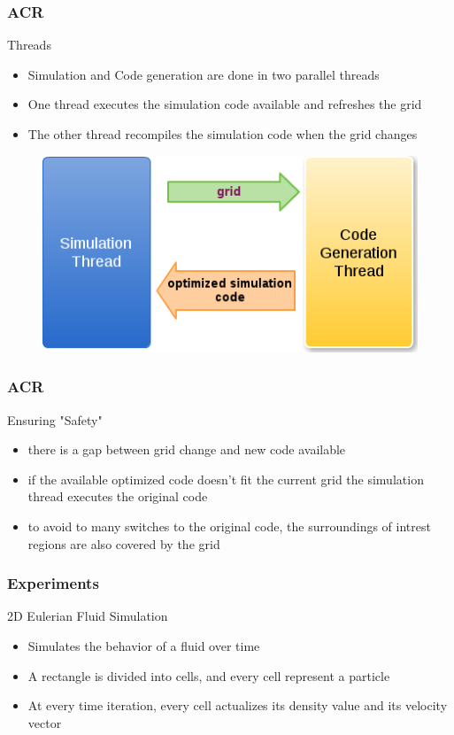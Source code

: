 \documentclass{beamer}\usetheme{Madrid} %
\begin{document}
\begin{frame}
\frametitle { ACR } Threads
\begin{itemize}
	\item
		Simulation and Code generation are done in two parallel threads
	\item
		One thread executes the simulation code available and refreshes 
		the grid
	\item
		The other thread recompiles the simulation code when the grid 
		changes
\end{itemize}
	\begin{figure}
        \includegraphics[scale=0.50]{img/threads-w.png}
\end{figure}
\end{frame}
\begin{frame}
\frametitle { ACR } Ensuring "Safety" 
\begin{itemize}
	\item
		there is a gap between grid change and new code available
	\item
		if the available optimized code doesn't fit the current grid
		the simulation thread executes the original code
	\item
		to avoid to many switches to the original code, the surroundings
		of intrest regions are also covered by the grid
\end{itemize}
\end{frame}
\begin{frame}
\frametitle { Experiments } 2D Eulerian Fluid Simulation
\begin{itemize}
	\item
		Simulates the behavior of a fluid over time
	\item
		A rectangle is divided into cells, and every cell represent a 
		particle
	\item
		At every time iteration, every cell actualizes its density value
		and its velocity vector
\end{itemize}
\end{frame}
\end{document}
